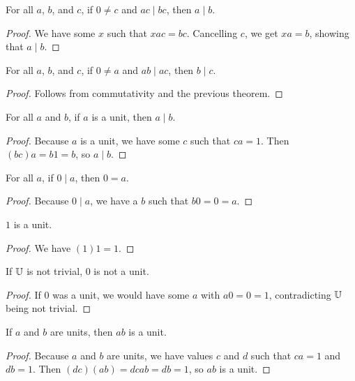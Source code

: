 \documentclass[../../math.tex]{subfiles}
\begin{document}
\begin{theorem} \label{div_rcancel}
    For all $a$, $b$, and $c$, if $0 \neq c$ and $ac \mid bc$, then $a \mid b$.
\end{theorem}
\begin{proof}
    We have some $x$ such that $xac = bc$.  Cancelling $c$, we get $xa = b$,
    showing that $a \mid b$.
\end{proof}

\begin{theorem} \label{div_lcancel}
    For all $a$, $b$, and $c$, if $0 \neq a$ and $ab \mid ac$, then $b \mid c$.
\end{theorem}
\begin{proof}
    Follows from commutativity and the previous theorem.
\end{proof}

\begin{theorem} \label{unit_div}
    For all $a$ and $b$, if $a$ is a unit, then $a \mid b$.
\end{theorem}
\begin{proof}
    Because $a$ is a unit, we have some $c$ such that $ca = 1$.  Then $(bc)a =
    b1 = b$, so $a \mid b$.
\end{proof}

\begin{theorem} \label{div_zero}
    For all $a$, if $0 \mid a$, then $0 = a$.
\end{theorem}
\begin{proof}
    Because $0 \mid a$, we have a $b$ such that $b0 = 0 = a$.
\end{proof}

\begin{theorem} \label{one_unit}
    $1$ is a unit.
\end{theorem}
\begin{proof}
    We have $(1)1 = 1$.
\end{proof}

\begin{theorem} \label{zero_not_unit}
    If $\mathbb{U}$ is not trivial, $0$ is not a unit.
\end{theorem}
\begin{proof}
    If $0$ was a unit, we would have some $a$ with $a0 = 0 = 1$, contradicting
    $\mathbb{U}$ being not trivial.
\end{proof}

\begin{theorem} \label{unit_mult}
    If $a$ and $b$ are units, then $ab$ is a unit.
\end{theorem}
\begin{proof}
    Because $a$ and $b$ are units, we have values $c$ and $d$ such that $ca = 1$
    and $db = 1$.  Then $(dc)(ab) = dcab = db = 1$, so $ab$ is a unit.
\end{proof}
\end{document}
